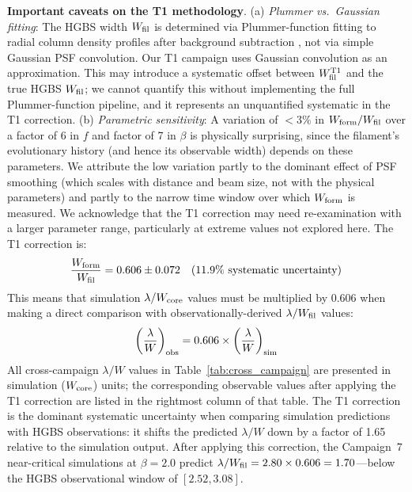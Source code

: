 \documentclass[twoside,twocolumn]{mnras}
\begin{document}
\textbf{Important caveats on the T1 methodology}. (a) \textit{Plummer vs.\ Gaussian fitting}: The HGBS width $W_{\rm fil}$ is determined via Plummer-function fitting to radial column density profiles after background subtraction \citep{Arzoumanian2011, Arzoumanian2019}, not via simple Gaussian PSF convolution. Our T1 campaign uses Gaussian convolution as an approximation. This may introduce a systematic offset between $W_{\rm fil}^{\rm T1}$ and the true HGBS $W_{\rm fil}$; we cannot quantify this without implementing the full Plummer-function pipeline, and it represents an unquantified systematic in the T1 correction. (b) \textit{Parametric sensitivity}: A variation of $<3\%$ in $W_{\rm form}/W_{\rm fil}$ over a factor of 6 in $f$ and factor of 7 in $\beta$ is physically surprising, since the filament's evolutionary history (and hence its observable width) depends on these parameters. We attribute the low variation partly to the dominant effect of PSF smoothing (which scales with distance and beam size, not with the physical parameters) and partly to the narrow time window over which $W_{\rm form}$ is measured. We acknowledge that the T1 correction may need re-examination with a larger parameter range, particularly at extreme values not explored here. The T1 correction is:
\begin{equation}
\frac{W_{\rm form}}{W_{\rm fil}} = 0.606 \pm 0.072 \quad (11.9\% \text{ systematic uncertainty})
\label{eq:t1_correction}
\end{equation}
This means that simulation $\lambda/W_{\rm core}$ values must be multiplied by $0.606$ when making a direct comparison with observationally-derived $\lambda/W_{\rm fil}$ values:
\begin{equation}
\left(\frac{\lambda}{W}\right)_{\rm obs} = 0.606 \times \left(\frac{\lambda}{W}\right)_{\rm sim}
\label{eq:t1_apply}
\end{equation}
All cross-campaign $\lambda/W$ values in Table~\ref{tab:cross_campaign} are presented in simulation ($W_{\rm core}$) units; the corresponding observable values after applying the T1 correction are listed in the rightmost column of that table. The T1 correction is the dominant systematic uncertainty when comparing simulation predictions with HGBS observations: it shifts the predicted $\lambda/W$ down by a factor of 1.65 relative to the simulation output. After applying this correction, the Campaign~7 near-critical simulations at $\beta = 2.0$ predict $\lambda/W_{\rm fil} = 2.80 \times 0.606 = 1.70$---below the HGBS observational window of $[2.52, 3.08]$.
\end{document}
